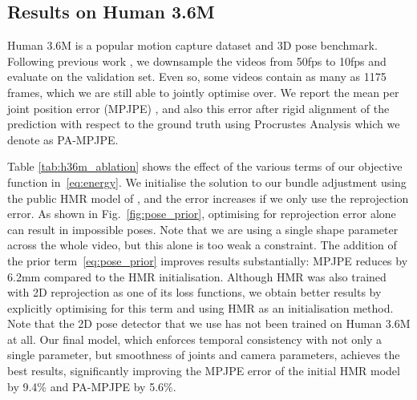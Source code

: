 \documentclass[10pt,twocolumn,letterpaper]{article}
\begin{document}
\subsection{Results on Human 3.6M}
\label{sec:exp_h36m}

Human 3.6M \cite{ionescu_pami_2014} is a popular motion capture dataset and 3D pose benchmark.
Following previous work \cite{pavlakos_cvpr_2017, rogez_cvpr_2017, kanazawa_cvpr_2018}, we downsample the videos from 50fps to 10fps and evaluate on the validation set.
Even so, some videos contain as many as 1175 frames, which we are still able to jointly optimise over.
We report the mean per joint position error (MPJPE) \cite{ionescu_pami_2014},
and also this error after rigid alignment of the prediction with respect to the ground truth using Procrustes Analysis \cite{gower_1975} which we denote as PA-MPJPE.

\begin{table}[tb]
\centering
\caption{Ablation study on Human 3.6M, considering the effect of different terms of our objective function~\eqref{eq:energy}. Mean errors over the validation set are reported.}
\label{tab:h36m_ablation}
\end{table} 

Table \ref{tab:h36m_ablation} shows the effect of the various terms of our objective function in~\eqref{eq:energy}.
We initialise the solution to our bundle adjustment using the public HMR model of \cite{kanazawa_cvpr_2018}, and the error increases if we only use the reprojection error.
As shown in Fig.~\ref{fig:pose_prior}, optimising for reprojection error alone can result in impossible poses.
Note that we are using a single  shape parameter across the whole video, but this alone is too weak a constraint.
The addition of the prior term~\eqref{eq:pose_prior} improves results substantially: MPJPE reduces by 6.2mm compared to the HMR initialisation.
Although HMR was also trained with 2D reprojection as one of its loss functions, we obtain better results by explicitly optimising for this term and using HMR 
as an initialisation method.
Note that the 2D pose detector that we use \cite{papandreou_cvpr_2017} has not been trained on Human 3.6M at all.
Our final model, which enforces temporal consistency with not only a single  parameter, but smoothness of joints and camera parameters, achieves the best results, significantly improving the MPJPE error of the initial HMR model by 9.4\% and PA-MPJPE by 5.6\%.
\end{document}
